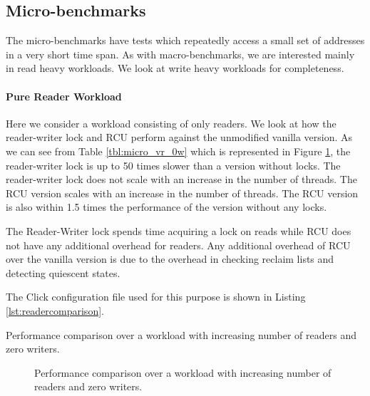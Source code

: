 \documentclass[a4paper,marginparwidth=50pt,marginparsep=10pt]{article}
\begin{document}
\subsection{Micro-benchmarks}
\label{sec:microbenchmarks}
The micro-benchmarks have tests which repeatedly access a small set of addresses in a very short time span.
As with macro-benchmarks, we are interested mainly in read heavy workloads. We look at write heavy workloads for completeness.

\paragraph{Pure Reader Workload}
Here we consider a workload consisting of only readers. We look at how the reader-writer lock and RCU perform against the unmodified vanilla version.
As we can see from Table \ref{tbl:micro_vr_0w} which is represented in Figure \ref{img:micro_vr_0w}, the reader-writer lock is up to 50 times slower than a version without locks.
The reader-writer lock does not scale with an increase in the number of threads. The RCU version scales with an increase in the number of threads. The RCU version is also within 1.5 times the performance of the version without any locks.

The Reader-Writer lock spends time acquiring a lock on reads while RCU does not have any additional overhead for readers. Any additional overhead of RCU over the vanilla version is due to the overhead in checking reclaim lists and detecting quiescent states.

The Click configuration file used for this purpose is shown in Listing \ref{lst:readercomparison}.
\begin{table}
\begin{center}

\end{center}
\label{tbl:micro_vr_0w}
\caption{Performance comparison over a workload with increasing number of readers and zero writers.}
\end{table}

\begin{figure}[tph]
\caption{Performance comparison over a workload with increasing number of readers and zero writers.}
\label{img:micro_vr_0w}
\end{figure}
\end{document}
